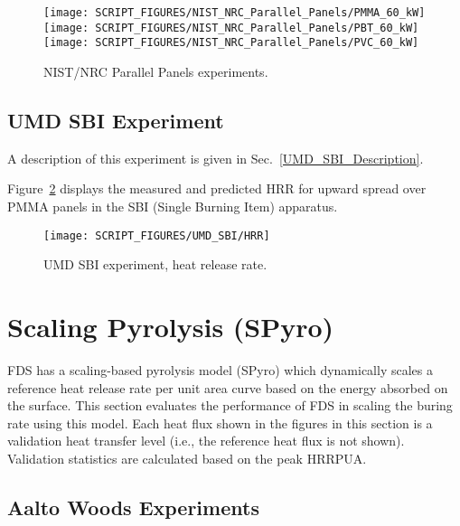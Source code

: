 \begin{figure}[!ht]
\centering
\texttt{[image: SCRIPT\_FIGURES/NIST\_NRC\_Parallel\_Panels/PMMA\_60\_kW]} \\
\texttt{[image: SCRIPT\_FIGURES/NIST\_NRC\_Parallel\_Panels/PBT\_60\_kW]} \\
\texttt{[image: SCRIPT\_FIGURES/NIST\_NRC\_Parallel\_Panels/PVC\_60\_kW]}
\caption[NIST/NRC Parallel Panels experiments]{NIST/NRC Parallel Panels experiments.}
\label{NIST_NRC_PP_HRR}
\end{figure}


\clearpage

\subsection{UMD SBI Experiment}

A description of this experiment is given in Sec.~\ref{UMD_SBI_Description}.

Figure~\ref{UMD_SBI_HRR} displays the measured and predicted HRR for upward spread over PMMA panels in the SBI (Single Burning Item) apparatus.

\begin{figure}[!ht]
\centering
\texttt{[image: SCRIPT\_FIGURES/UMD\_SBI/HRR]}
\caption[UMD SBI experiment, heat release rate]{UMD SBI experiment, heat release rate.}
\label{UMD_SBI_HRR}
\end{figure}

\clearpage

\section{Scaling Pyrolysis (SPyro)}\label{sec_Scaling Pyrolysis}

FDS has a scaling-based pyrolysis model (SPyro) which dynamically scales a reference heat release rate per unit area curve based on the energy absorbed on the surface. This section evaluates the performance of FDS in scaling the buring rate using this model. Each heat flux shown in the figures in this section is a validation heat transfer level (i.e., the reference heat flux is not shown). Validation statistics are calculated based on the peak HRRPUA.

\subsection{Aalto Woods Experiments}\label{sec_Aalto_Woods_Materials}

